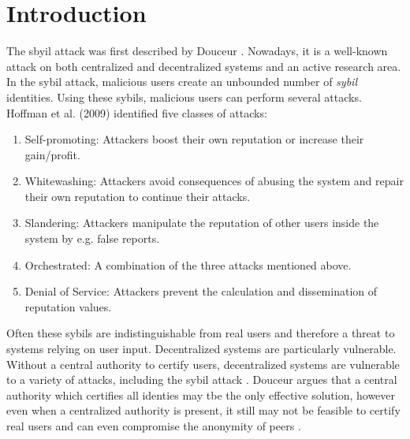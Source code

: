 \section{Introduction}
	\label{sct:introduction}
	The sbyil attack was first described by Douceur \cite{douceur2002sybil}. Nowadays, it is a well-known attack on both centralized and decentralized systems and an active research area.
	In the sybil attack, malicious users create an unbounded number of \emph{sybil} identities.
	Using these sybils, malicious users can perform several attacks. 
	Hoffman et al. (2009) \nocite{hoffman2009survey} identified five classes of attacks: 
	\begin{enumerate}
		\item Self-promoting: Attackers boost their own reputation or increase their gain/profit.
		\item Whitewashing: Attackers avoid consequences of abusing the system and repair their own reputation to continue their attacks.
		\item Slandering: Attackers manipulate the reputation of other users inside the system by e.g. false reports.
		\item Orchestrated: A combination of the three attacks mentioned above.
		\item Denial of Service: Attackers prevent the calculation and dissemination of reputation values. 
	\end{enumerate}
	Often these sybils are indistinguishable from real users and therefore a threat to systems relying on user input.
	Decentralized systems are particularly vulnerable.
	Without a central authority to certify users, decentralized systems are vulnerable to a variety of attacks, including the sybil attack \cite{jetter2010quantitative}.
	Douceur argues that a central authority which certifies all identies may tbe the only effective solution, however even when a centralized authority is present, it still may not be feasible to certify real users and can even compromise the anonymity of peers \cite{margolin2005quantifying, dewan2005securing}.
	
